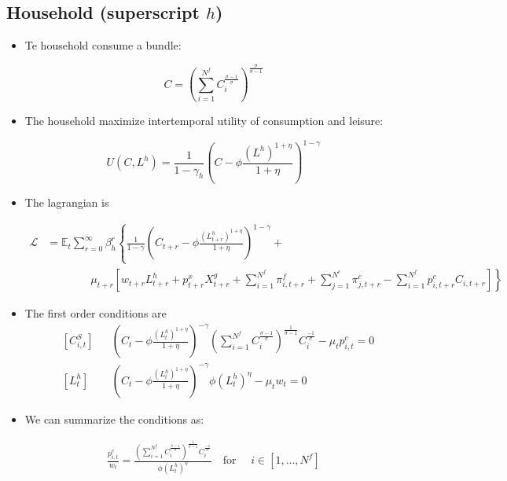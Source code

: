\documentclass[11pt]{article}
\newcommand{\E}{\mathbb{E}}
\numberwithin{equation}{section}
\begin{document}
\subsection{Household (superscript $h$)}
\begin{itemize}
	
	\item Te household consume a bundle:
	
	$$C = \left( \sum_{i=1}^{N^f} C^{\frac{\sigma-1}{\sigma}}_i \right)^{\frac{\sigma}{\sigma-1}}$$
	 
	\item The household maximize intertemporal utility of consumption and leisure:
	
	$$ U(C, L^h) = \frac{1}{1-\gamma_h} \left(C- \phi \frac{\left( L^h \right)^{1+\eta}}{1+\eta} \right)^{1-\gamma} $$
	
	\item The lagrangian is
	
	\begin{align*}
	\mathcal{L} &= \E_t\sum_{r=0}^{\infty}\beta_h^r 
	\left\lbrace 
	\frac{1}{1-\gamma} \left(C_{t+r}- \phi \frac{\left(L^h_{t+r}\right)^{1+\eta}}{1+\eta} \right)^{1-\gamma}
	+ 
	\right.
	\\
	&\qquad\qquad \left.
	\mu_{t+r}
	\left[ w_{t+r} L^h_{t+r} +p^x_{t+r} X^g_{t+r}+\sum_{i=1}^{N^f} \pi_{i,t+r}^f + \sum_{j=1}^{N^c} \pi_{j,t+r}^c- \sum_{i=1}^{N^f} p^c_{i,t+r} C_{i,t+r}\right]  
	\right\rbrace
	\end{align*}
	
	\item The first order conditions are
	\begin{align}
	& \left[C_{i,t}^S\right]
	&&
	\left(C_{t} - \phi\frac{\left(L^h_t\right)^{1+\eta}}{1+\eta} \right)^{-\gamma} \left( \sum_{i=1}^{N^f} C_i^{\frac{\sigma-1}{\sigma}} \right)^{\frac{1}{\sigma-1}} C_i^{\frac{-1}{\sigma}}- \mu_t p^c_{i,t} =0
	\\
	& \left[L^h_t\right]
	&&
 \left(C_{t} - \phi\frac{\left(L^h_t\right)^{1+\eta}}{1+\eta} \right)^{-\gamma} \phi \left(L^h_t\right)^{\eta} - \mu_t w_{t} =0
	\end{align}	
	
	\item We can summarize the conditions as:
	
	\begin{align}
	\frac{p^c_{i,t}}{w_t} = \frac{\left( \sum_{i=1}^{N^f} C_i^{\frac{\sigma-1}{\sigma}} \right)^{\frac{1}{\sigma-1}} C_i^{\frac{-1}{\sigma}}}{\phi \left(L^h_t\right)^{\eta}} \quad \text{for } \quad i \in [1,...,N^f]
	\end{align}
	
\end{itemize}
\end{document}
